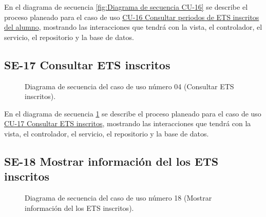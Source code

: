 En el diagrama de secuencia \ref{fig:Diagrama de secuencia CU-16} se describe el proceso planeado para el caso de uso \hyperlink{CU-16}{CU-16 Consultar periodos de ETS inscritos del alumno}, mostrando las interacciones que tendrá con la vista, el controlador, el servicio, el repositorio y la base de datos.

\newpage

\subsection{SE-17 Consultar ETS inscritos}

\begin{figure}[htbp!]
	\begin{center}
		\caption{Diagrama de secuencia del caso de uso número 04 (Consultar ETS inscritos).}
		\label{fig:Diagrama de secuencia CU-17}
	\end{center}
\end{figure}

En el diagrama de secuencia \ref{fig:Diagrama de secuencia CU-17} se describe el proceso planeado para el caso de uso \hyperlink{CU-17}{CU-17 Consultar  ETS inscritos}, mostrando las interacciones que tendrá con la vista, el controlador, el servicio, el repositorio y la base de datos.

\newpage

\subsection{SE-18 Mostrar información del los ETS inscritos}

\begin{figure}[htbp!]
	\begin{center}
		\caption{Diagrama de secuencia del caso de uso número 18 (Mostrar información del los ETS inscritos).}
		\label{fig:Diagrama de secuencia CU-18}
	\end{center}
\end{figure}

